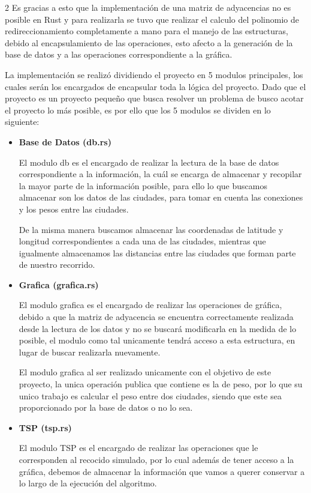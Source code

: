 \begin{multicols}{2}
 Es gracias a esto que la implementación de una matriz de adyacencias no es posible en Rust y para realizarla se tuvo que realizar el calculo del polinomio de redireccionamiento completamente a mano para el manejo de las estructuras, debido al encapsulamiento de las operaciones, esto afecto a la generación de la base de datos y a las operaciones correspondiente a la gráfica. 
 
 La implementación se realizó dividiendo el proyecto en 5 modulos principales, los cuales serán los encargados de encapsular toda la lógica del proyecto. Dado que el proyecto es un proyecto pequeño que busca resolver un problema de busco acotar el proyecto lo más posible, es por ello que los 5 modulos se dividen en lo siguiente:

 \begin{itemize}

 \item \textbf{Base de Datos (db.rs)}
   
 El modulo db es el encargado de realizar la lectura de la base de datos correspondiente a la información, la cuál se encarga de almacenar y recopilar la mayor parte de la información posible, para ello lo que buscamos almacenar son los datos de las ciudades, para tomar en cuenta las conexiones y los pesos entre las ciudades.

 De la misma manera buscamos almacenar las coordenadas de latitude y longitud correspondientes a cada una de las ciudades, mientras que igualmente almacenamos las distancias entre las ciudades que forman parte de nuestro recorrido.

\item \textbf{Grafica (grafica.rs)}

  El modulo grafica es el encargado de realizar las operaciones de gráfica, debido a que la matriz de adyacencia se encuentra correctamente realizada desde la lectura de los datos y no se buscará modificarla en la medida de lo posible, el modulo como tal unicamente tendrá acceso a esta estructura, en lugar de buscar realizarla nuevamente.

  El modulo grafica al ser realizado unicamente con el objetivo de este proyecto, la unica operación publica que contiene es la de peso, por lo que su unico trabajo es calcular el peso entre dos ciudades, siendo que este sea proporcionado por la base de datos o no lo sea. 
  
\item \textbf{TSP (tsp.rs)}

  El modulo TSP es el encargado de realizar las operaciones que le corresponden al recocido simulado, por lo cual además de tener acceso a la gráfica, debemos de almacenar la información que vamos a querer conservar a lo largo de la ejecución del algoritmo.


\end{itemize}
\end{multicols}
